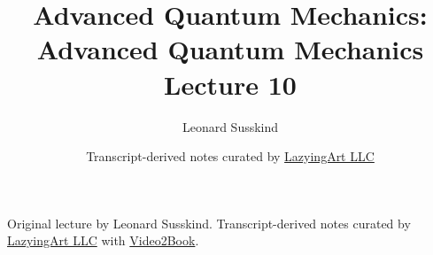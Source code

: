 \documentclass[11pt,oneside]{book}
\begin{document}
\frontmatter
\title{Advanced Quantum Mechanics: Advanced Quantum Mechanics Lecture 10}
\author{Leonard Susskind}
\date{Transcript-derived notes curated by \href{https://lazying.art}{LazyingArt LLC}}
\maketitle
\begin{center}
\small Original lecture by Leonard Susskind. Transcript-derived notes curated by \href{https://lazying.art}{LazyingArt LLC} with \href{https://github.com/lachlanchen/Video2Book}{Video2Book}.
\end{center}
\clearpage
\mainmatter

\end{document}
